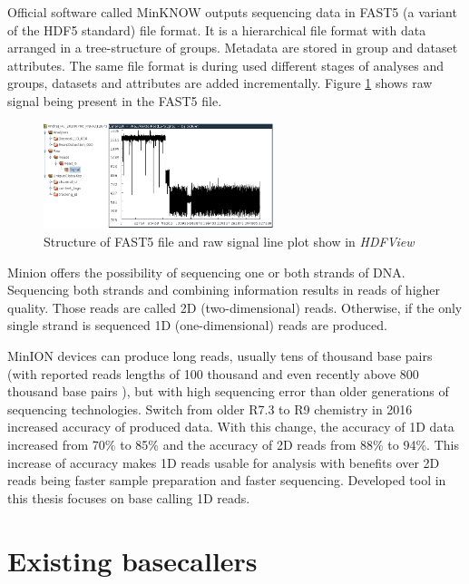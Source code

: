 \documentclass[times, utf8, diplomski, numeric, english]{fer}
\begin{document}
Official software called MinKNOW outputs sequencing data in FAST5 (a variant of the HDF5 standard) file format. It is a hierarchical file format with data arranged in a tree-structure of groups. Metadata are stored in group and dataset attributes. The same file format is during used different stages of analyses and groups, datasets and attributes are added incrementally. Figure \ref{fg:fast5} shows raw signal being present in the FAST5 file.
\begin{figure}[!ht]
	\begin{center}
		\includegraphics[width=0.6\textwidth]{./imgs/fast5.png}
		\caption[Structure of FAST5 file and raw signal plot show in \textit{HDFView}]{Structure of FAST5 file and raw signal line plot show in \textit{HDFView} \protect\footnotemark}
		\label{fg:fast5}
	\end{center}
\end{figure}


Minion offers the possibility of sequencing one or both strands of DNA. Sequencing both strands and combining information results in reads of higher quality. Those reads are called 2D (two-dimensional) reads. Otherwise, if the only single strand is sequenced 1D (one-dimensional) reads are produced.

MinION devices can produce long reads, usually tens of thousand base pairs (with reported reads lengths of 100 thousand \cite{loman1-100k} and even recently above 800 thousand base pairs \cite{loman2-800k}), but with high sequencing error than older generations of sequencing technologies.
Switch from older R7.3 to  R9 chemistry in 2016 increased accuracy of produced data. With this change, the accuracy of 1D data increased from 70\% to 85\% and the accuracy of 2D reads from 88\% to 94\%\cite{nanopore_video}.  This increase of accuracy makes 1D reads usable for analysis with benefits over 2D reads being faster sample preparation and faster sequencing. Developed tool in this thesis focuses on base calling 1D reads.


  
\section{Existing basecallers}
\end{document}
